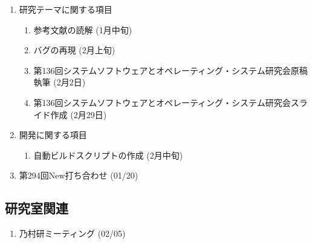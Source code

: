 \documentclass[fleqn, 14pt]{extarticle}
\begin{document}
    \begin{enumerate}

        \item 研究テーマに関する項目
            \hfill
            \begin{enumerate}

                \item 参考文献の読解
                    \hfill
                    (1月中旬)

                \item バグの再現
                    \hfill
                    (2月上旬)

                \item 第136回システムソフトウェアとオペレーティング・システム研究会原稿執筆
                    \hfill
                    (2月2日)

                \item 第136回システムソフトウェアとオペレーティング・システム研究会スライド作成
                    \hfill
                    (2月29日)


            \end{enumerate}

        \item 開発に関する項目
            \hfill
            \begin{enumerate}

                \item 自動ビルドスクリプトの作成
                    \hfill
                    (2月中旬)

            \end{enumerate}

        \item 第294回New打ち合わせ
            \hfill
            \label{enum-7}
            (01/20)

    \end{enumerate}

    \subsection{研究室関連}
    \label{sec-4-2}

    \begin{enumerate}

        \item 乃村研ミーティング
            \hfill
            \label{enum-18}
            (02/05)

    \end{enumerate}
\end{document}
